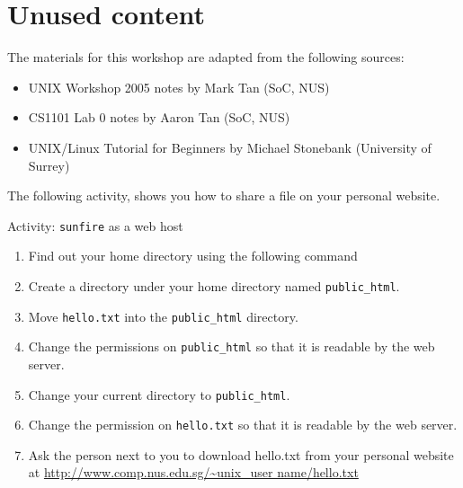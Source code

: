 \section{Unused content}

\begin{frame}
The materials for this workshop are adapted from the following sources:
\begin{itemize}
\item UNIX Workshop 2005 notes by Mark Tan (SoC, NUS)
\item CS1101 Lab 0 notes by Aaron Tan (SoC, NUS)
\item UNIX/Linux Tutorial for Beginners by Michael Stonebank (University of Surrey)
\end{itemize}
\end{frame}

The following activity, shows you how to share a file on your personal website.  

\begin{frame}[allowframebreaks=0.6]{Activity: \texttt{sunfire} as a web host}
\begin{enumerate}
\item Find out your home directory using the following command
\item Create a directory under your home directory named
\texttt{public\_html}. 
\item Move \texttt{hello.txt} into the \texttt{public\_html} directory. 
\item Change the permissions on \texttt{public\_html} so that it is readable by
the web server. 
\item Change your current directory to \texttt{public\_html}. 
\item Change the permission on \texttt{hello.txt} so that it is readable by the
web server.  
\item Ask the person next to you to download hello.txt from your personal
website at \url{http://www.comp.nus.edu.sg/~unix_user name/hello.txt}
\end{enumerate}
\end{frame}



